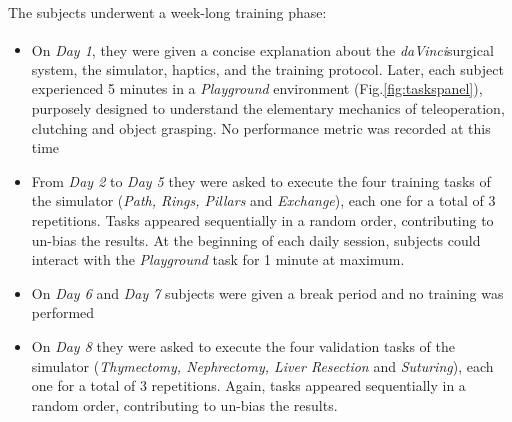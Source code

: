 \documentclass{article}
\newcommand{\cright}{\textsuperscript{\textregistered}\phantom{..}}
\begin{document}
\begin{multicols}{2}
The subjects underwent a week-long training phase:
\begin{itemize}
  \item On \textit{Day 1}, they were given a concise explanation about the \textit{daVinci}\cright surgical system, the simulator, haptics, and the training protocol. Later, each subject experienced 5 minutes in a \textit{Playground} environment (Fig.\ref{fig:taskspanel}), purposely designed to understand the elementary mechanics of teleoperation, clutching and object grasping. No performance metric was recorded at this time
  \item From \textit{Day 2} to \textit{Day 5} they were asked to execute the four training tasks of the simulator (\textit{Path, Rings, Pillars} and \textit{Exchange}), each one for a total of 3 repetitions. Tasks appeared sequentially in a random order, contributing to un-bias the results. At the beginning of each daily session, subjects could interact with the \textit{Playground} task for 1 minute at maximum.
  \item On \textit{Day 6} and \textit{Day 7} subjects were given a break period and no training was performed
  \item On \textit{Day 8} they were asked to execute the four validation tasks of the simulator (\textit{Thymectomy, Nephrectomy, Liver Resection} and \textit{Suturing}), each one for a total of 3 repetitions. Again, tasks appeared sequentially in a random order, contributing to un-bias the results.
\end{itemize}


\end{multicols}
\end{document}
